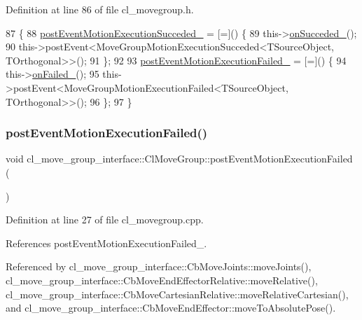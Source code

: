 Definition at line 86 of file cl\+\_\+movegroup.\+h.


\begin{DoxyCode}
87   \{
88     \hyperlink{classcl__move__group__interface_1_1ClMoveGroup_a1e95dacf3393a4e4eff40395e8edfccd}{postEventMotionExecutionSucceded\_} = [=]() \{
89       this->\hyperlink{classcl__move__group__interface_1_1ClMoveGroup_aefc24baaaed9ac7615f4dca20b8a077e}{onSucceded\_}();
90       this->postEvent<MoveGroupMotionExecutionSucceded<TSourceObject, TOrthogonal>>();
91     \};
92 
93     \hyperlink{classcl__move__group__interface_1_1ClMoveGroup_ae7ade7ead3390b444ad4f802de1ec62d}{postEventMotionExecutionFailed\_} = [=]() \{
94       this->\hyperlink{classcl__move__group__interface_1_1ClMoveGroup_a3e0ea6acf70a0c527864b712b215033b}{onFailed\_}();
95       this->postEvent<MoveGroupMotionExecutionFailed<TSourceObject, TOrthogonal>>();
96     \};
97   \}
\end{DoxyCode}
\mbox{\label{classcl__move__group__interface_1_1ClMoveGroup_a39dc3871d29b2af1ab739057f6ca6daa}} 
\subsubsection{\texorpdfstring{post\+Event\+Motion\+Execution\+Failed()}{postEventMotionExecutionFailed()}}
{\footnotesize\ttfamily void cl\+\_\+move\+\_\+group\+\_\+interface\+::\+Cl\+Move\+Group\+::post\+Event\+Motion\+Execution\+Failed (\begin{DoxyParamCaption}{ }\end{DoxyParamCaption})}



Definition at line 27 of file cl\+\_\+movegroup.\+cpp.



References post\+Event\+Motion\+Execution\+Failed\+\_\+.



Referenced by cl\+\_\+move\+\_\+group\+\_\+interface\+::\+Cb\+Move\+Joints\+::move\+Joints(), cl\+\_\+move\+\_\+group\+\_\+interface\+::\+Cb\+Move\+End\+Effector\+Relative\+::move\+Relative(), cl\+\_\+move\+\_\+group\+\_\+interface\+::\+Cb\+Move\+Cartesian\+Relative\+::move\+Relative\+Cartesian(), and cl\+\_\+move\+\_\+group\+\_\+interface\+::\+Cb\+Move\+End\+Effector\+::move\+To\+Absolute\+Pose().


